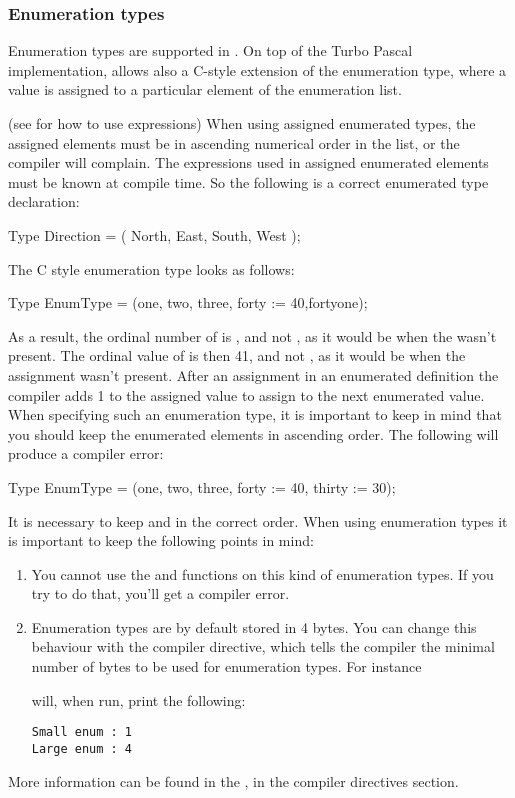 \documentclass{report}
\begin{document}
\subsubsection{Enumeration types}
Enumeration types are supported in \fpc. On top of the Turbo Pascal
implementation, \fpc allows also a C-style extension of the
enumeration type, where a value is assigned to a particular element of
the enumeration list.

(see  for how to use expressions)
When using assigned enumerated types, the assigned elements must be in
ascending numerical order in the list, or the compiler will complain.
The expressions used in assigned enumerated elements must be known at
compile time.
So the following is a correct enumerated type declaration:
\begin{listing}
Type
  Direction = ( North, East, South, West );
\end{listing}
The C style enumeration type looks as follows:
\begin{listing}
Type
  EnumType = (one, two, three, forty := 40,fortyone);
\end{listing}
As a result, the ordinal number of  is , and not ,
as it would be when the  wasn't present.
The ordinal value of  is then {41}, and not , as it
would be when the assignment wasn't present. After an assignment in an
enumerated definition the compiler adds 1 to the assigned value to assign to
the next enumerated value.
When specifying such an enumeration type, it is important to keep in mind
that you should keep the enumerated elements in ascending order. The
following will produce a compiler error:
\renewcommand{\prelisting}{\sffamily}
\begin{listing}
Type
  EnumType = (one, two, three, forty := 40, thirty := 30);
\end{listing}
It is necessary to keep  and  in the correct order.
When using enumeration types it is important to keep the following points 
in mind:
\begin{enumerate}
\item You cannot use the  and  functions on
this kind of enumeration types. If you try to do that, you'll get a compiler
error.
\item Enumeration types are by default stored in 4 bytes. You can change
this behaviour with the  compiler directive, which
tells the compiler the minimal number of bytes to be used for enumeration
types.
For instance
will, when run, print the following: 
\begin{verbatim}
Small enum : 1
Large enum : 4
\end{verbatim}
\end{enumerate}
More information can be found in the \progref, in the compiler directives
section.
\end{document}
